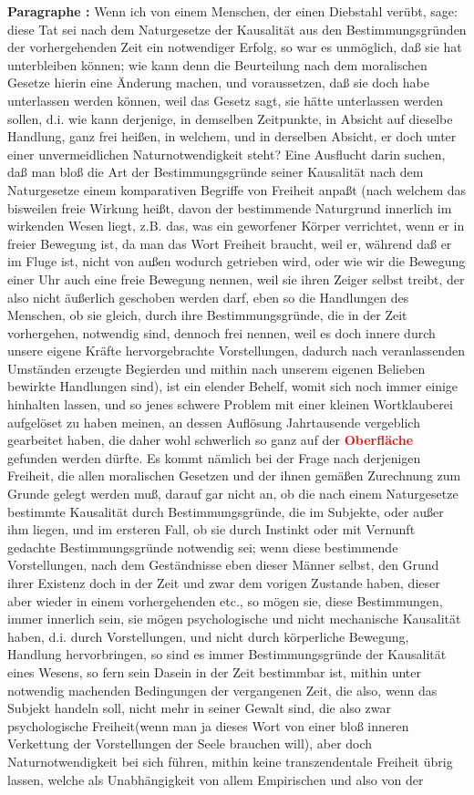 \documentclass[a4paper,12pt,twoside]{book}
\newcommand{\match}[1]{\textcolor{red}{\textbf{#1}}}
\begin{document}
	\textbf{Paragraphe : }Wenn ich von einem Menschen, der einen Diebstahl verübt, sage: diese Tat sei nach dem Naturgesetze der Kausalität aus den Bestimmungsgründen der vorhergehenden Zeit ein notwendiger Erfolg, so war es unmöglich, daß sie hat unterbleiben können; wie kann denn die Beurteilung nach dem moralischen Gesetze hierin eine Änderung machen, und voraussetzen, daß sie doch habe unterlassen werden können, weil das Gesetz sagt, sie hätte unterlassen werden sollen, d.i. wie kann derjenige, in demselben Zeitpunkte, in Absicht auf dieselbe Handlung, ganz frei heißen, in welchem, und in  derselben Absicht, er doch unter einer unvermeidlichen Naturnotwendigkeit steht? Eine Ausflucht darin suchen, daß man bloß die Art der Bestimmungsgründe seiner Kausalität nach dem Naturgesetze einem komparativen Begriffe von Freiheit anpaßt (nach welchem das bisweilen freie Wirkung heißt, davon der bestimmende Naturgrund innerlich im wirkenden Wesen liegt, z.B. das, was ein geworfener Körper verrichtet, wenn er in freier Bewegung ist, da man das Wort Freiheit braucht, weil er, während daß er im Fluge ist, nicht von außen wodurch getrieben wird, oder wie wir die Bewegung einer Uhr auch eine freie Bewegung nennen, weil sie ihren Zeiger selbst treibt, der also nicht äußerlich geschoben werden darf, eben so die Handlungen des Menschen, ob sie gleich, durch ihre Bestimmungsgründe, die in der Zeit vorhergehen, notwendig sind, dennoch frei nennen, weil es doch innere durch unsere eigene Kräfte hervorgebrachte Vorstellungen, dadurch nach veranlassenden Umständen erzeugte Begierden und mithin nach unserem eigenen Belieben bewirkte Handlungen sind), ist ein elender Behelf, womit sich noch immer einige hinhalten lassen, und so jenes schwere Problem mit einer kleinen Wortklauberei aufgelöset zu haben meinen, an dessen Auflösung Jahrtausende vergeblich gearbeitet haben, die daher wohl schwerlich so ganz auf der \match{Oberfläche} gefunden werden dürfte. Es kommt nämlich bei der Frage nach derjenigen Freiheit, die allen moralischen Gesetzen und der ihnen gemäßen Zurechnung zum Grunde gelegt werden muß, darauf gar nicht an, ob die nach einem Naturgesetze bestimmte Kausalität durch Bestimmungsgründe, die im Subjekte, oder außer ihm liegen, und im ersteren Fall, ob sie durch Instinkt oder mit Vernunft gedachte Bestimmungsgründe notwendig sei; wenn diese bestimmende Vorstellungen, nach dem Geständnisse eben dieser Männer selbst, den Grund ihrer Existenz doch in der Zeit und zwar dem vorigen Zustande haben, dieser aber wieder in einem vorhergehenden etc., so mögen sie, diese Bestimmungen, immer innerlich sein, sie mögen psychologische und nicht mechanische Kausalität haben, d.i. durch Vorstellungen, und nicht durch körperliche Bewegung,  Handlung hervorbringen, so sind es immer Bestimmungsgründe der Kausalität eines Wesens, so fern sein Dasein in der Zeit bestimmbar ist, mithin unter notwendig machenden Bedingungen der vergangenen Zeit, die also, wenn das Subjekt handeln soll, nicht mehr in seiner Gewalt sind, die also zwar psychologische Freiheit(wenn man ja dieses Wort von einer bloß inneren Verkettung der Vorstellungen der Seele brauchen will), aber doch Naturnotwendigkeit bei sich führen, mithin keine transzendentale Freiheit übrig lassen, welche als Unabhängigkeit von allem Empirischen und also von der 
\end{document}
